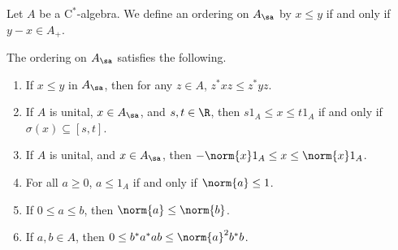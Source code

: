 \begin{definition}\label{def:ordering_of_cstar_algebras}
  Let $A$ be a $\mathrm{C}^{\ast}$-algebra. We define an ordering on $A_{\sa}$ by $x\leq y$ if and only if $y-x\in A_{+}$.
\end{definition}
\begin{proposition}
  The ordering on $A_{\sa}$ satisfies the following.
  \begin{enumerate}[(1)]
    \item If $x\leq y$ in $A_{\sa}$, then for any $z\in A$, $z^{\ast}xz \leq z^{\ast}yz$.
    \item If $A$ is unital, $x\in A_{\sa}$, and $s,t\in \R$, then $s1_A \leq x \leq t1_A$ if and only if $\sigma\left( x \right)\subseteq [s,t]$.
    \item If $A$ is unital, and $x\in A_{\sa}$, then $-\norm{x}1_A \leq x \leq \norm{x}1_A$.
    \item For all $a\geq 0$, $a\leq 1_A$ if and only if $\norm{a}\leq 1$.
    \item If $0\leq a \leq b$, then $\norm{a}\leq \norm{b}$.
    \item If $a,b\in A$, then $0\leq b^{\ast}a^{\ast}ab \leq \norm{a}^2b^{\ast}b$.
  \end{enumerate}
\end{proposition}
